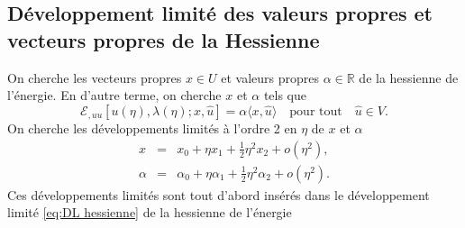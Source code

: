 \documentclass{article}
\begin{document}
\subsection{Développement limité des valeurs propres et vecteurs
propres de la Hessienne}

On cherche les vecteurs propres $x \in U$ et valeurs propres $\alpha \in
\mathbb{R}$ de la hessienne de l'énergie. En d'autre terme, on cherche $x$
et $\alpha$ tels que
\begin{equation}
  \mathcal{E}_{, u  u} [u (\eta), \lambda (\eta) ; x, \hat{u}] =
  \alpha \langle x, \hat{u} \rangle \quad \text{pour tout} \quad \hat{u} \in
  V.
\end{equation}
On cherche les développements limités à l'ordre 2 en $\eta$ de $x$
et $\alpha$
\begin{eqnarray*}
  x & = & x_0 + \eta x_1 + \tfrac{1}{2} \eta^2 x_2 + o (\eta^2),\\
  \alpha & = & \alpha_0 + \eta \alpha_1 + \tfrac{1}{2} \eta^2 \alpha_2 + o
  (\eta^2) .
\end{eqnarray*}
Ces développements limités sont tout d'abord insérés dans le
développement limité \eqref{eq:DL hessienne} de la hessienne de
l'énergie
\end{document}
